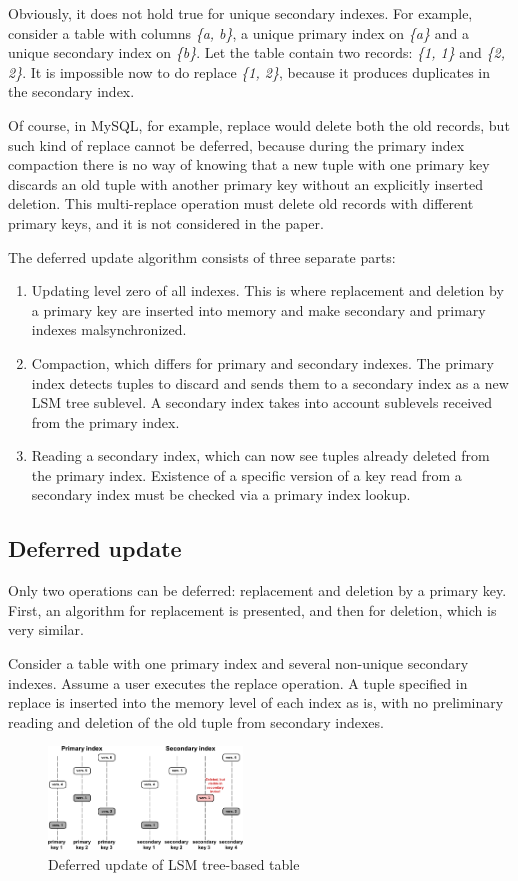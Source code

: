 \documentclass{vldb}
\begin{document}
Obviously, it does not hold true for unique secondary indexes. For example,
consider a table with columns \textit{\{a, b\}}, a unique primary index on
\textit{\{a\}} and a unique secondary index on \textit{\{b\}}. Let the table contain
two records: \textit{\{1, 1\}} and \textit{\{2, 2\}}. It is impossible now to do
replace \textit{\{1, 2\}}, because it produces duplicates in the secondary index.

Of course, in MySQL, for example, replace would delete both the old records, but
such kind of replace cannot be deferred, because during the primary index
compaction there is no way of knowing that a new tuple with one primary key
discards an old tuple with another primary key without an explicitly inserted
deletion. This multi-replace operation must delete old records with different
primary keys, and it is not considered in the paper.

The deferred update algorithm consists of three separate parts:
\begin{enumerate}
\item Updating level zero of all indexes. This is where replacement and deletion by
a primary key are inserted into memory and make secondary and primary indexes
malsynchronized.
\item Compaction, which differs for primary and secondary indexes. The primary
index detects tuples to discard and sends them to a secondary index as a new
LSM tree sublevel. A secondary index takes into account sublevels received from
the primary index.
\item Reading a secondary index, which can now see tuples already deleted from the
primary index. Existence of a specific version of a key read from a secondary
index must be checked via a primary index lookup.
\end{enumerate}

\subsection{Deferred update}
Only two operations can be deferred: replacement and deletion by a primary key.
First, an algorithm for replacement is presented, and then for deletion, which is
very similar.

Consider a table with one primary index and several non-unique secondary indexes.
Assume a user executes the replace operation. A tuple specified in replace is inserted
into the memory level of each index as is, with no preliminary reading and deletion
of the old tuple from secondary indexes.
\begin{figure}
\centering
\includegraphics[width=0.46\textwidth]{table_after_deferred_update}
\caption{Deferred update of LSM tree-based table}
\label{fig:table_after_deferred_update}
\end{figure}
\end{document}
